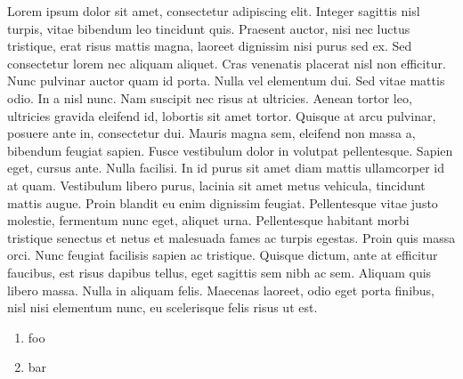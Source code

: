 




\begin{assignment}
    Lorem ipsum dolor sit amet, consectetur adipiscing elit. Integer sagittis nisl turpis, vitae bibendum leo tincidunt quis. Praesent auctor, nisi nec luctus tristique, erat risus mattis magna, laoreet dignissim nisi purus sed ex. Sed consectetur lorem nec aliquam aliquet. Cras venenatis placerat nisl non efficitur. Nunc pulvinar auctor quam id porta. Nulla vel elementum dui. Sed vitae mattis odio. In a nisl nunc. Nam suscipit nec risus at ultricies. Aenean tortor leo, ultricies gravida eleifend id, lobortis sit amet tortor. Quisque at arcu pulvinar, posuere ante in, consectetur dui. Mauris magna sem, eleifend non massa a, bibendum feugiat sapien. Fusce vestibulum dolor in volutpat pellentesque.
    Sapien eget, cursus ante. Nulla facilisi. In id purus sit amet diam mattis ullamcorper id at quam. Vestibulum libero purus, lacinia sit amet metus vehicula, tincidunt mattis augue. Proin blandit eu enim dignissim feugiat. Pellentesque vitae justo molestie, fermentum nunc eget, aliquet urna. Pellentesque habitant morbi tristique senectus et netus et malesuada fames ac turpis egestas. Proin quis massa orci. Nunc feugiat facilisis sapien ac tristique. Quisque dictum, ante at efficitur faucibus, est risus dapibus tellus, eget sagittis sem nibh ac sem. Aliquam quis libero massa. Nulla in aliquam felis. Maecenas laoreet, odio eget porta finibus, nisl nisi elementum nunc, eu scelerisque felis risus ut est.
    \begin{enumerate}
        \item foo
        \item bar
    \end{enumerate}
    \solution{
}
\end{assignment}
